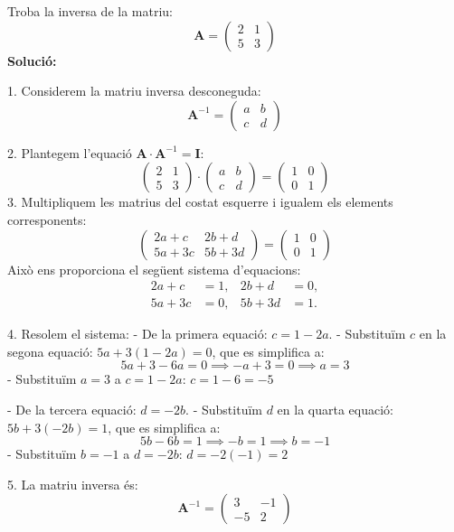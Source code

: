 \documentclass[12pt]{article}
\newcommand{\mat}[1]{\mathbf{#1}}
\begin{document}
\begin{exemple}
Troba la inversa de la matriu:
\[
\mat{A} = \begin{pmatrix}
2 & 1 \\
5 & 3
\end{pmatrix}
\]
\textbf{Solució:}

1. Considerem la matriu inversa desconeguda:
\[
\mat{A}^{-1} = \begin{pmatrix}
a & b \\
c & d
\end{pmatrix}
\]

2. Plantegem l’equació $\mat{A} \cdot \mat{A}^{-1} = \mat{I}$:
\[
\begin{pmatrix}
2 & 1 \\
5 & 3
\end{pmatrix} 
\cdot 
\begin{pmatrix}
a & b \\
c & d
\end{pmatrix}
=
\begin{pmatrix}
1 & 0 \\
0 & 1
\end{pmatrix}
\]
3. Multipliquem les matrius del costat esquerre i igualem els elements corresponents:
\[
\begin{pmatrix}
2a + c & 2b + d \\
5a + 3c & 5b + 3d
\end{pmatrix}
=
\begin{pmatrix}
1 & 0 \\
0 & 1
\end{pmatrix}
\]
Això ens proporciona el següent sistema d’equacions:
\[
\begin{aligned}
2a + c &= 1, & 2b + d &= 0, \\
5a + 3c &= 0, & 5b + 3d &= 1.
\end{aligned}
\]

4. Resolem el sistema:
   - De la primera equació: \( c = 1 - 2a \).
   - Substituïm \( c \) en la segona equació: \( 5a + 3(1 - 2a) = 0 \), que es simplifica a:
\[
5a + 3 - 6a = 0 \implies -a + 3 = 0 \implies a = 3
\]
   - Substituïm \( a = 3 \) a \( c = 1 - 2a \): \( c = 1 - 6 = -5 \)

   - De la tercera equació: \( d = -2b \).
   - Substituïm \( d \) en la quarta equació: \( 5b + 3(-2b) = 1 \), que es simplifica a:
\[
5b - 6b = 1 \implies -b = 1 \implies b = -1
\]
   - Substituïm \( b = -1 \) a \( d = -2b \): \( d = -2(-1) = 2 \)

5. La matriu inversa és:
\[
\mat{A}^{-1} = \begin{pmatrix}
3 & -1 \\
-5 & 2
\end{pmatrix}
\]
\end{exemple}
\end{document}
